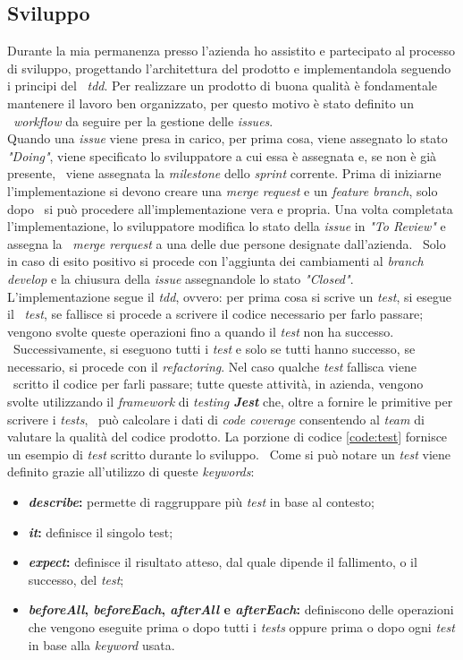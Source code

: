 \subsection{Sviluppo}
Durante la mia permanenza presso l'azienda ho assistito e partecipato al processo di sviluppo, progettando l'architettura del prodotto e implementandola seguendo i principi del \
\emph{\acrfull{tdd}}. Per realizzare un prodotto di buona qualità è fondamentale mantenere il lavoro ben organizzato, per questo motivo è stato definito un \
\emph{workflow} da seguire per la gestione delle \emph{issues}. \\

Quando una \emph{issue} viene presa in carico, per prima cosa, viene assegnato lo stato \emph{"Doing"}, viene specificato lo sviluppatore a cui essa è assegnata e, se non è già presente, \
viene assegnata la \emph{milestone} dello \emph{sprint} corrente. Prima di iniziarne l'implementazione si devono creare una \emph{merge request} e un \emph{feature branch}, solo dopo \
si può procedere all'implementazione vera e propria. Una volta completata l'implementazione, lo sviluppatore modifica lo stato della \emph{issue} in \emph{"To Review"} e assegna la \
\emph{merge rerquest} a una delle due persone designate dall'azienda. \
Solo in caso di esito positivo si procede con l'aggiunta dei cambiamenti al \emph{branch develop} e la chiusura della \emph{issue} assegnandole lo stato \emph{"Closed"}. \\

L'implementazione segue il \emph{\acrlong{tdd}}, ovvero: per prima cosa si scrive un \emph{test}, si esegue il \
\emph{test}, se fallisce si procede a scrivere il codice necessario per farlo passare; vengono svolte queste operazioni fino a quando il \emph{test} non ha successo. \
Successivamente, si eseguono tutti i \emph{test} e solo se tutti hanno successo, se necessario, si procede con il \emph{refactoring}. Nel caso qualche \emph{test} fallisca viene \
scritto il codice per farli passare; tutte queste attività, in azienda, vengono svolte utilizzando il \emph{framework} di \emph{testing \textbf{Jest}} che, oltre a fornire le primitive per scrivere i \emph{tests}, \
può calcolare i dati di \emph{code coverage} consentendo al \emph{team} di valutare la qualità del codice prodotto. La porzione di codice \ref{code:test} fornisce un esempio di \emph{test} scritto durante lo sviluppo. \
Come si può notare un \emph{test} viene definito grazie all'utilizzo di queste \emph{keywords}:
\begin{itemize}
  \item \textbf{\emph{describe}:} permette di raggruppare più \emph{test} in base al contesto;
  \item \textbf{\emph{it}:} definisce il singolo test;
  \item \textbf{\emph{expect}:} definisce il risultato atteso, dal quale dipende il fallimento, o il successo, del \emph{test};
  \item \textbf{\emph{beforeAll}, \emph{beforeEach}, \emph{afterAll} e \emph{afterEach}:} definiscono delle operazioni che vengono eseguite prima o dopo tutti i \emph{tests} oppure prima o dopo ogni \emph{test} in base alla \emph{keyword} usata.
\end{itemize}

